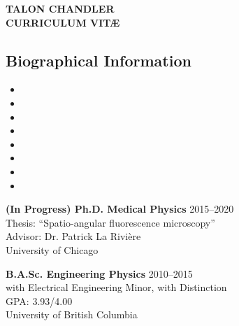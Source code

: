 \documentclass[12pt,letterpaper]{article}
\begin{document}
\begin{center}
{\Large \textbf{TALON CHANDLER}}\\
{\textbf{CURRICULUM VIT\AE}}\\
\end{center}

\vspace{-1em}

\subsection*{Biographical Information}
\begin{itemize}[noitemsep]
\item[]  
\item[]  
\item[]  
\item[] \itab{} 
\item[] \itab{} 
\item[]  
\item[]  
\item[]  
\end{itemize}

\begin{benumerate}{2}
\item
  \textbf{(In Progress) Ph.D. Medical Physics} \hfill 2015--2020\\
  Thesis: ``Spatio-angular fluorescence microscopy''\\
  Advisor: Dr. Patrick La Rivi\`ere \\
  University of Chicago
\item
  \textbf{B.A.Sc. Engineering Physics} \hfill 2010--2015\\
  with Electrical Engineering Minor, with Distinction\\
  GPA: 3.93/4.00\\
  University of British Columbia
\end{benumerate}

\nocite{*}
\setlength{}
\printbibliography[heading=none, type=article, sorting=ynt, resetnumbers=true]

\nocite{*}
\setlength{}
\printbibliography[heading=none, type=misc, sorting=ynt, resetnumbers=true]
\end{document}
